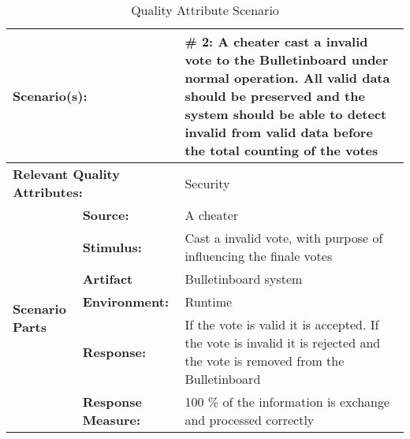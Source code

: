 \begin{table}[H]
\begin{center}
\begin{tabular}{|p{0.3cm}|p{2.5cm}|p{8cm}|}
  \hline
  \multicolumn{2}{|p{3cm}|}{\bfseries Scenario(s):} & \#  2: A cheater cast a invalid vote to the Bulletinboard under normal operation. All valid data should be preserved and the system should be able to detect invalid from  valid data before the total counting of the votes\\
  \hline
  \multicolumn{2}{|p{3cm}|}{\bfseries Relevant Quality Attributes:} & Security\\
  \hline
  \multirow{6}{*}{\begin{sideways}{\bfseries Scenario Parts}\end{sideways}}
  & {\bfseries Source:} & A cheater \\
  \cline{2-3}
  & {\bfseries Stimulus:} & Cast a invalid vote, with purpose of influencing the finale votes \\
  \cline{2-3}
  & {\bfseries Artifact} &  Bulletinboard system \\
  \cline{2-3}
  & {\bfseries Environment:} &  Runtime \\
  \cline{2-3}
  & {\bfseries Response:} &  If the vote is valid it is accepted. If the vote is invalid it is rejected and the vote is removed from the Bulletinboard \\
  \cline{2-3}
  & {\bfseries Response Measure:} & 100 \% of the information is exchange and processed correctly \\
  \hline
\end{tabular}
\caption{Quality Attribute Scenario}
\end{center}
\end{table}

